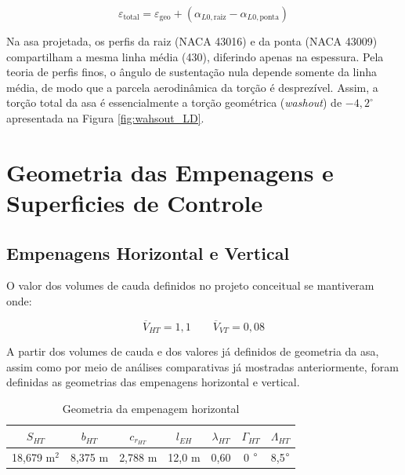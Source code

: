 \begin{equation}
  \varepsilon_{\mathrm{total}} = \varepsilon_{\mathrm{geo}}
  + \left(\alpha_{L0,\mathrm{raiz}} - \alpha_{L0,\mathrm{ponta}}\right)
  \label{eq:torcao_total}
\end{equation}

Na asa projetada, os perfis da raiz (NACA 43016) e da ponta (NACA 43009) compartilham a mesma linha média (430), diferindo apenas na espessura. Pela teoria de perfis finos, o ângulo de sustentação nula depende somente da linha média, de modo que a parcela aerodinâmica da torção é desprezível. Assim, a torção total da asa é essencialmente a torção geométrica (\textit{washout}) de $-4{,}2^\circ$ apresentada na Figura \autoref{fig:wahsout_LD}.

\section{Geometria das Empenagens e Superficies de Controle}

\subsection{Empenagens Horizontal e Vertical}

O valor dos volumes de cauda definidos no projeto conceitual se mantiveram onde: 

\begin{equation*}
    \overline{V}_{HT} = 1,1   \qquad  \overline{V}_{VT} = 0,08
\end{equation*}

A partir dos volumes de cauda e dos valores já definidos de geometria da asa, assim como por meio de análises comparativas já mostradas anteriormente, foram definidas as geometrias das empenagens horizontal e vertical.




\begin{table}[H]
    \centering
    \caption{Geometria da empenagem horizontal}
    \begin{tabular}{c c c c c c c}
    \hline
     $S_{HT}$  & $b_{HT}$ & $c_{r_{HT}}$ & $l_{EH}$ & $\lambda_{HT}$ & $\Gamma_{HT}$ & $\Lambda_{HT}$ \\
     \hline
     18,679 m$^2$ & 8,375 m & 2,788 m & 12,0 m & 0,60 & 0 $\degree$ &  8,5$\degree$ \\
     \hline
    \end{tabular}
    \label{GeoEH_Final}
\end{table}

